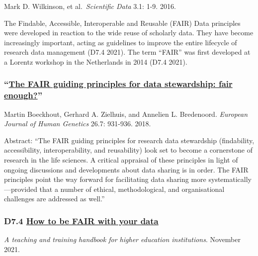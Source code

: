 \documentclass[
]{book}
\begin{document}
Mark D. Wilkinson, et al.~\emph{Scientific Data} 3.1: 1-9. 2016.

The Findable, Accessible, Interoperable and Reusable (FAIR) Data principles were developed in reaction to the wide reuse of scholarly data. They have become increasingly important, acting as guidelines to improve the entire lifecycle of research data management (D7.4 2021). The term ``FAIR'' was first developed at a Lorentz workshop in the Netherlands in 2014 (D7.4 2021).

\hypertarget{the-fair-guiding-principles-for-data-stewardship-fair-enough}{%
\subsubsection*{\texorpdfstring{``\href{https://www.ncbi.nlm.nih.gov/pmc/articles/PMC6018669/}{The FAIR guiding principles for data stewardship: fair enough?}''}{``The FAIR guiding principles for data stewardship: fair enough?''}}\label{the-fair-guiding-principles-for-data-stewardship-fair-enough}}

Martin Boeckhout, Gerhard A. Zielhuis, and Annelien L. Bredenoord. \emph{European Journal of Human Genetics} 26.7: 931-936. 2018.

Abstract: ``The FAIR guiding principles for research data stewardship (findability, accessibility, interoperability, and reusability) look set to become a cornerstone of research in the life sciences. A critical appraisal of these principles in light of ongoing discussions and developments about data sharing is in order. The FAIR principles point the way forward for facilitating data sharing more systematically---provided that a number of ethical, methodological, and organisational challenges are addressed as well.''

\hypertarget{d7.4-how-to-be-fair-with-your-data}{%
\subsubsection*{\texorpdfstring{D7.4 \href{https://zenodo.org/record/5837500\#.Yhk8L5PMJ6e}{How to be FAIR with your data}}{D7.4 How to be FAIR with your data}}\label{d7.4-how-to-be-fair-with-your-data}}

\emph{A teaching and training handbook for higher education institutions}. November 2021.
\end{document}
